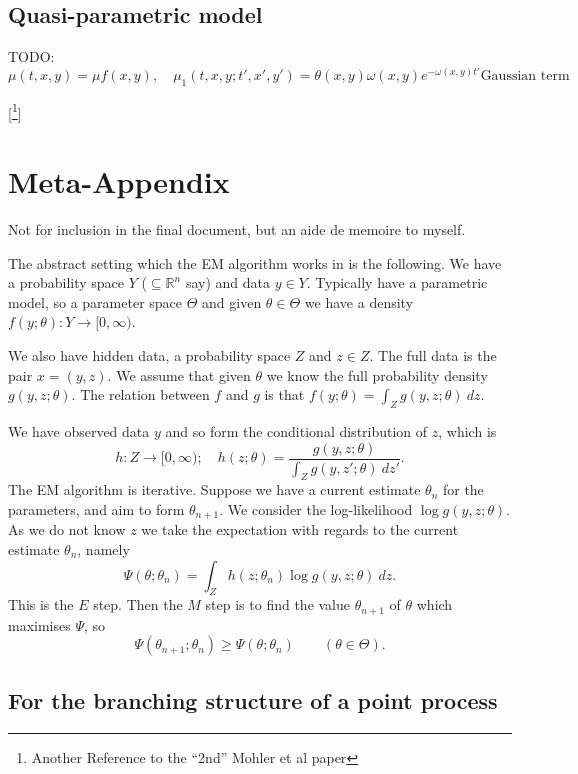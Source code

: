 \documentclass[twoside,a4paper]{article}
\theoremstyle{plain}
\theoremstyle{definition}
\begin{document}
\subsection{Quasi-parametric model}

TODO:
\[ \mu(t,x,y) = \mu f(x,y), \quad
\mu_1(t,x,y; t',x',y') = \theta(x,y) \omega(x,y) e^{-\omega(x,y) t'} \text{Gaussian term} \]





[\footnote{Another Reference to the ``2nd'' Mohler et al paper}]




\section{Meta-Appendix}

Not for inclusion in the final document, but an aide de memoire to myself.

The abstract setting which the EM algorithm works in is the following.  We have a probability space
$Y$ ($\subseteq\mathbb R^n$ say) and data $y\in Y$.  Typically have a parametric model, so a parameter
space $\Theta$ and given $\theta\in\Theta$ we have a density $f(y;\theta) : Y\rightarrow [0,\infty)$.

We also have hidden data, a probability space $Z$ and $z\in Z$.  The full data is the pair $x = (y,z)$.
We assume that given $\theta$ we know the full probability density $g(y,z;\theta)$.  The relation between
$f$ and $g$ is that $f(y;\theta) = \int_Z g(y,z;\theta) \ dz$.

We have observed data $y$ and so form the conditional distribution of $z$, which is
\[ h: Z\rightarrow [0,\infty); \quad h(z;\theta) = \frac{g(y,z;\theta)}{\int_Z g(y,z';\theta) \ dz'}. \]
The EM algorithm is iterative.  Suppose we have a current estimate $\theta_n$ for the parameters, and
aim to form $\theta_{n+1}$.  We consider the log-likelihood $\log g(y,z;\theta)$.  As we do not know
$z$ we take the expectation with regards to the current estimate $\theta_n$, namely
\[ \Psi(\theta;\theta_n) = \int_Z h(z;\theta_n) \log g(y,z;\theta) \ dz. \]
This is the $E$ step.  Then the $M$ step is to find the value $\theta_{n+1}$ of $\theta$ which maximises
$\Psi$, so
\[ \Psi(\theta_{n+1};\theta_n) \geq \Psi(\theta;\theta_n) \qquad (\theta\in\Theta). \]



\subsection{For the branching structure of a point process}
\end{document}
